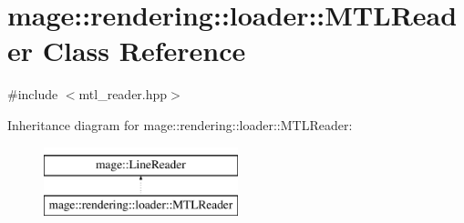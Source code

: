 \hypertarget{classmage_1_1rendering_1_1loader_1_1_m_t_l_reader}{}\section{mage\+:\+:rendering\+:\+:loader\+:\+:M\+T\+L\+Reader Class Reference}
\label{classmage_1_1rendering_1_1loader_1_1_m_t_l_reader}


{\ttfamily \#include $<$mtl\+\_\+reader.\+hpp$>$}

Inheritance diagram for mage\+:\+:rendering\+:\+:loader\+:\+:M\+T\+L\+Reader\+:\begin{figure}[H]
\begin{center}
\leavevmode
\includegraphics[height=2.000000cm]{classmage_1_1rendering_1_1loader_1_1_m_t_l_reader}
\end{center}
\end{figure}
